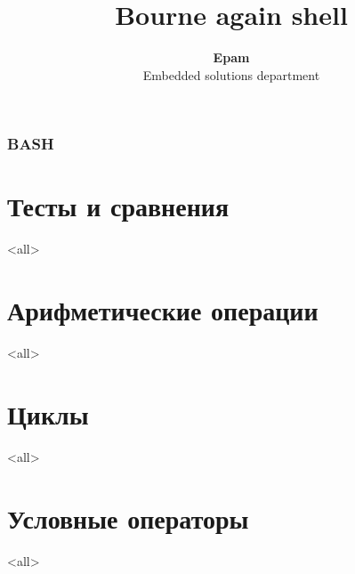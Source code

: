 \documentclass[ignorenonframetext, professionalfonts, hyperref={pdftex, unicode}]{beamer}
\title[bash]{Bourne again shell}
\author[Epam]{{\bf Epam}\\Embedded solutions department}
\begin{document}



\begin{frame}
	\frametitle{BASH}
	\titlepage
	\vspace{-0.5cm}
	\begin{center}
	\end{center}
\end{frame}

\begin{frame}
	\tableofcontents
\end{frame}




\section{Тесты и сравнения}

\mode<all>{}


\section{Арифметические операции}

\mode<all>{}

\section{Циклы}

\mode<all>{}

\section{Условные операторы}

\mode<all>{}





\end{document}
